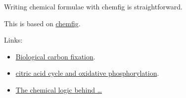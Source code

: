 \documentclass[a4paper,14pt]{extarticle}
\begin{document}
Writing chemical formulae with chemfig is straightforward.

This is based on \href{https://www.overleaf.com/learn/latex/Chemistry_formulae}{chemfig}.

Links:
\begin{itemize}
    \item\href{https://en.wikipedia.org/wiki/Biological_carbon_fixation}{Biological carbon fixation}.
    \item\href{https://courses.lumenlearning.com/wm-nmbiology1/chapter/citric-acid-cycle-and-oxidative-phosphorylation/}{citric
        acid cycle and oxidative phosphorylation}.
    \item\href{http://homepage.ufp.pt/pedros/bq/tca.htm}{The chemical logic behind \ldots}
\end{itemize}
\end{document}
